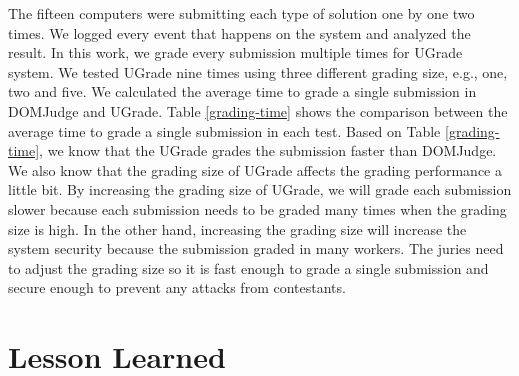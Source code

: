 \documentclass[conference]{IEEEtran}
\begin{document}
The fifteen computers were submitting each type of solution one by one two times. We logged every event that happens on the system and analyzed the result. In this work, we grade every submission multiple times for UGrade system. We tested UGrade nine times using three different grading size, e.g., one, two and five. We calculated the average time to grade a single submission in DOMJudge and UGrade. Table \ref{grading-time} shows the comparison between the average time to grade a single submission in each test. Based on Table \ref{grading-time}, we know that the UGrade grades the submission faster than DOMJudge. We also know that the grading size of UGrade affects the grading performance a little bit. By increasing the grading size of UGrade, we will grade each submission slower because each submission needs to be graded many times when the grading size is high. In the other hand, increasing the grading size will increase the system security because the submission graded in many workers. The juries need to adjust the grading size so it is fast enough to grade a single submission and secure enough to prevent any attacks from contestants.

\section{Lesson Learned}
\end{document}

